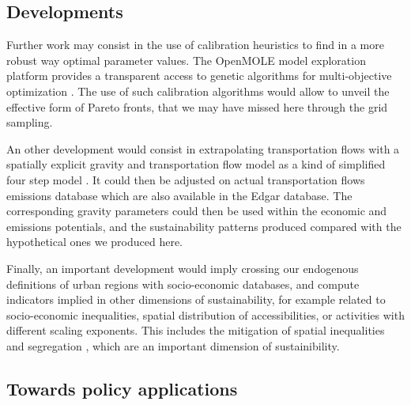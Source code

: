 \documentclass{jimis-en}
\begin{document}




\subsection{Developments}

Further work may consist in the use of calibration heuristics to find in a more robust way optimal parameter values. The OpenMOLE model exploration platform provides a transparent access to genetic algorithms for multi-objective optimization \citep{reuillon2013openmole}. The use of such calibration algorithms would allow to unveil the effective form of Pareto fronts, that we may have missed here through the grid sampling.


An other development would consist in extrapolating transportation flows with a spatially explicit gravity and transportation flow model as a kind of simplified four step model \citep{mcnally2000four}. It could then be adjusted on actual transportation flows emissions database which are also available in the Edgar database. The corresponding gravity parameters could then be used within the economic and emissions potentials, and the sustainability patterns produced compared with the hypothetical ones we produced here.

Finally, an important development would imply crossing our endogenous definitions of urban regions with socio-economic databases, and compute indicators implied in other dimensions of sustainability, for example related to socio-economic inequalities, spatial distribution of accessibilities, or activities with different scaling exponents. This includes the mitigation of spatial inequalities and segregation \citep{tammaru2015multi}, which are an important dimension of sustainibility.



\subsection{Towards policy applications}
\end{document}
